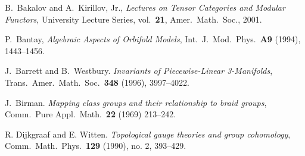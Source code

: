 \documentclass{amsart}
\begin{document}
\medskip


 

\begin{thebibliography}{0}



 B.\ Bakalov and A.\ Kirillov, Jr., {\em Lectures on
Tensor Categories and Modular Functors}, University Lecture Series,
vol.\ {\bf 21},  Amer.\ Math.\ Soc., 2001.

 P.\ Bantay, \emph{Algebraic Aspects of Orbifold Models}, Int.\ J.\ Mod.\ Phys.\ \textbf{A9} (1994), 1443--1456.

 J.\ Barrett and B.\ Westbury. {\em Invariants
of Piecewise-Linear 3-Manifolds}, Trans.\ Amer.\ Math.\ Soc.\ \textbf{348} (1996), 3997--4022.

 J.\ Birman. \emph{Mapping class groups and their relationship to braid groups}, Comm.\ Pure Appl.\ Math.\ \textbf{22} (1969) 213--242.





 R. Dijkgraaf and E. Witten. \emph{Topological gauge theories and group cohomology}, Comm.\ Math.\ Phys.\ \textbf{129} (1990), no. 2, 393--429.



\end{thebibliography}
\end{document}
